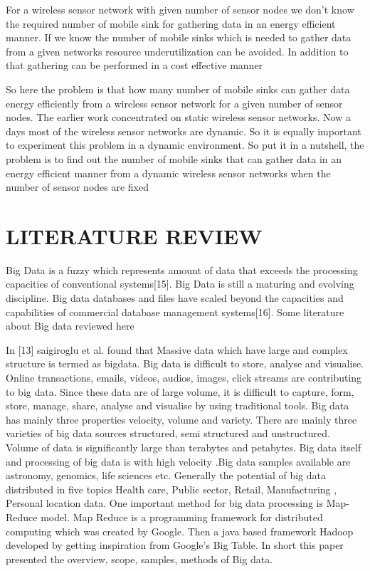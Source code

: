 \documentclass[MTech]{iitmdiss}
\begin{document}
 
For a wireless sensor network with given number of sensor nodes  we don't know the required number of mobile sink for gathering data in an energy efficient manner. If we know the number of mobile sinks which is needed to gather data from a given networks resource underutilization  can be avoided. In addition to that gathering can be performed in a cost effective manner
 
 
 So here the problem is that how many number of mobile sinks can gather data energy efficiently from a wireless sensor network for a given number of sensor nodes. The earlier work concentrated on static wireless sensor networks. Now a days most of the wireless sensor networks are dynamic. So it is equally important to experiment this problem in a dynamic environment. So put it in a nutshell, the problem is to find out the number of mobile sinks that can gather data in an energy efficient manner from a dynamic wireless sensor networks when the number of sensor nodes are fixed

\pagebreak
\chapter{LITERATURE REVIEW}
\label{chap:lit}
Big Data is a fuzzy which represents amount of data that exceeds
the processing capacities of conventional systems[15]. Big Data is still a maturing and 
evolving discipline. Big data databases and  files have scaled beyond the capacities and  capabilities of commercial database  management systems[16]. Some literature about Big data reviewed here


In [13] saigiroglu et al. found that Massive data which have large and complex structure is termed as bigdata. Big data is difficult to store, analyse and visualise. Online transactions, emails, videos, audios, images, click streams are contributing to big data. Since these data are of large volume, it is difficult to capture, form, store, manage, share, analyse and visualise by using traditional tools. Big data has mainly three properties velocity, volume and variety. There are mainly three varieties of big data sources structured, semi structured and unstructured. Volume of data is significantly large than terabytes and petabytes. Big data itself and processing of big data is with high velocity .Big data samples available are astronomy, genomics, life sciences etc. Generally the potential of big data  distributed in five topics Health care, Public sector, Retail, Manufacturing , Personal location data. One important method for big data processing is Map-Reduce model. Map Reduce is a programming framework  for distributed computing which was created by Google. Then a  java based framework Hadoop developed by getting inspiration from Google's Big Table. In short this paper presented the overview, scope, samples, methods of Big data.
\end{document}
